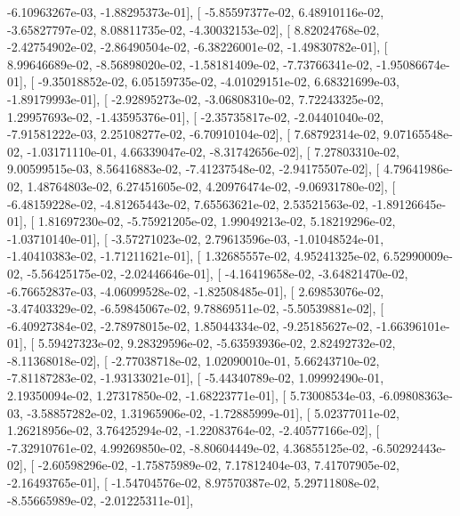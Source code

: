 \documentclass{article}
\begin{document}
         -6.10963267e-03,  -1.88295373e-01],
       [ -5.85597377e-02,   6.48910116e-02,  -3.65827797e-02,
          8.08811735e-02,  -4.30032153e-02],
       [  8.82024768e-02,  -2.42754902e-02,  -2.86490504e-02,
         -6.38226001e-02,  -1.49830782e-01],
       [  8.99646689e-02,  -8.56898020e-02,  -1.58181409e-02,
         -7.73766341e-02,  -1.95086674e-01],
       [ -9.35018852e-02,   6.05159735e-02,  -4.01029151e-02,
          6.68321699e-03,  -1.89179993e-01],
       [ -2.92895273e-02,  -3.06808310e-02,   7.72243325e-02,
          1.29957693e-02,  -1.43595376e-01],
       [ -2.35735817e-02,  -2.04401040e-02,  -7.91581222e-03,
          2.25108277e-02,  -6.70910104e-02],
       [  7.68792314e-02,   9.07165548e-02,  -1.03171110e-01,
          4.66339047e-02,  -8.31742656e-02],
       [  7.27803310e-02,   9.00599515e-03,   8.56416883e-02,
         -7.41237548e-02,  -2.94175507e-02],
       [  4.79641986e-02,   1.48764803e-02,   6.27451605e-02,
          4.20976474e-02,  -9.06931780e-02],
       [ -6.48159228e-02,  -4.81265443e-02,   7.65563621e-02,
          2.53521563e-02,  -1.89126645e-01],
       [  1.81697230e-02,  -5.75921205e-02,   1.99049213e-02,
          5.18219296e-02,  -1.03710140e-01],
       [ -3.57271023e-02,   2.79613596e-03,  -1.01048524e-01,
         -1.40410383e-02,  -1.71211621e-01],
       [  1.32685557e-02,   4.95241325e-02,   6.52990009e-02,
         -5.56425175e-02,  -2.02446646e-01],
       [ -4.16419658e-02,  -3.64821470e-02,  -6.76652837e-03,
         -4.06099528e-02,  -1.82508485e-01],
       [  2.69853076e-02,  -3.47403329e-02,  -6.59845067e-02,
          9.78869511e-02,  -5.50539881e-02],
       [ -6.40927384e-02,  -2.78978015e-02,   1.85044334e-02,
         -9.25185627e-02,  -1.66396101e-01],
       [  5.59427323e-02,   9.28329596e-02,  -5.63593936e-02,
          2.82492732e-02,  -8.11368018e-02],
       [ -2.77038718e-02,   1.02090010e-01,   5.66243710e-02,
         -7.81187283e-02,  -1.93133021e-01],
       [ -5.44340789e-02,   1.09992490e-01,   2.19350094e-02,
          1.27317850e-02,  -1.68223771e-01],
       [  5.73008534e-03,  -6.09808363e-03,  -3.58857282e-02,
          1.31965906e-02,  -1.72885999e-01],
       [  5.02377011e-02,   1.26218956e-02,   3.76425294e-02,
         -1.22083764e-02,  -2.40577166e-02],
       [ -7.32910761e-02,   4.99269850e-02,  -8.80604449e-02,
          4.36855125e-02,  -6.50292443e-02],
       [ -2.60598296e-02,  -1.75875989e-02,   7.17812404e-03,
          7.41707905e-02,  -2.16493765e-01],
       [ -1.54704576e-02,   8.97570387e-02,   5.29711808e-02,
         -8.55665989e-02,  -2.01225311e-01],
\end{document}
